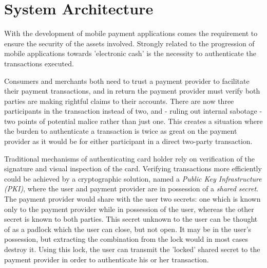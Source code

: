 \section{System Architecture}
\label{chap:hardware_architecture}
With the development of mobile payment applications comes the requirement to ensure the security of the assets involved.
Strongly related to the progression of mobile applications towards 'electronic cash' is the necessity to authenticate the transactions executed. \cite{herzberg2003payments}


Consumers and merchants both need to trust a payment provider to facilitate their payment transactions, and in return the payment provider must verify both parties are making rightful claims to their accounts.
There are now three participants in the transaction instead of two, and - ruling out internal sabotage - two points of potential malice rather than just one.
This creates a situation where the burden to authenticate a transaction is twice as great on the payment provider as it would be for either participant in a direct two-party transaction.

Traditional mechanisms of authenticating card holder rely on verification of the signature and visual inspection of the card.
Verifying transactions more efficiently could be achieved by a cryptographic solution, named a \textit{Public Key Infrastructure (PKI)}, where the user and payment provider are in possession of a \textit{shared secret}.
The payment provider would share with the user two secrets: one which is known only to the payment provider while in possession of the user, whereas the other secret is known to both parties.
This secret unknown to the user can be thought of as a padlock which the user can close, but not open.
It may be in the user's possession, but extracting the combination from the lock would in most cases destroy it.
Using this lock, the user can transmit the 'locked' shared secret to the payment provider in order to authenticate his or her transaction.


